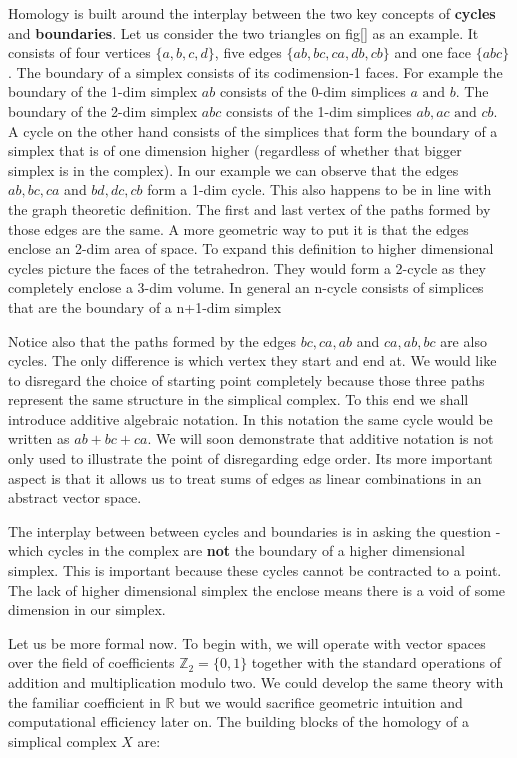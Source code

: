 Homology is built around the interplay between the two key concepts of \textbf{cycles} and \textbf{boundaries}. Let us consider the two triangles on fig[] as an example. It consists of four vertices $\{a, b, c, d\}$, five edges $\{ab, bc, ca, db, cb\}$ and one face $\{abc\}$. The boundary of a simplex consists of its codimension-1 faces. For example the boundary of the 1-dim simplex $ab$ consists of the 0-dim simplices $a \text{ and } b$. The boundary of the 2-dim simplex $abc$ consists of the 1-dim simplices $ab, ac \text{ and } cb$. A cycle on the other hand consists of the simplices that form the boundary of a simplex that is of one dimension higher (regardless of whether that bigger simplex is in the complex). In our example we can observe that the edges $ab, bc, ca$ and $bd, dc, cb$ form a 1-dim cycle.  This also happens to be in line with the graph theoretic definition. The first and last vertex of the paths formed by those edges are the same. A more geometric way to put it is that the edges enclose an 2-dim area of space.  To expand this definition to higher dimensional cycles picture the faces of the tetrahedron. They would form a 2-cycle as they completely enclose a 3-dim volume. In general an n-cycle consists of simplices that are the boundary of a n+1-dim simplex

Notice also that the paths formed by the edges $bc, ca, ab$ and $ca, ab, bc$ are also cycles. The only difference is which vertex they start and end at. We would like to disregard the choice of starting point completely because those three paths represent the same structure in the simplical complex. To this end we shall introduce additive algebraic notation. In this notation the same cycle would be written as $ab + bc + ca$.  We will soon demonstrate that additive notation is not only used to illustrate the point of disregarding edge order. Its more important aspect is that it allows us to treat sums of edges as linear combinations in an abstract vector space.

The interplay between between cycles and boundaries is in asking the question - which cycles in the complex are \textbf{not} the boundary of a higher dimensional simplex. This is important because these cycles cannot be contracted to a point. The lack of higher dimensional simplex the enclose means there is a void of some dimension in our simplex.

Let us be more formal now. To begin with, we will operate with vector spaces over the field of coefficients $\mathbb{Z}_2 = \{0, 1\}$ together with the standard operations of addition and multiplication modulo two. We could develop the same theory with the familiar coefficient in $\mathbb{R}$ but we would sacrifice geometric intuition and computational efficiency later on. The building blocks of the homology of a simplical complex $X$ are:


